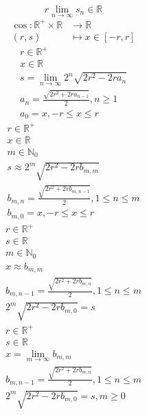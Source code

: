 \documentclass[a4paper,12pt]{report}
\begin{document}
\begin{equation}
r \lim_{n \to \infty} s_n \in \mathbb{R}
\end{equation}
\begin{equation}
\begin{aligned}
\cos \colon \mathbb{R}^{+} \times \mathbb{R} & \to \mathbb{R} \\
(r,s) & \mapsto x \in [-r,r]
\end{aligned}
\end{equation}
\begin{subequations}
\begin{gather}
r \in \mathbb{R}^+ \\
x \in \mathbb{R} \\
s = \lim \limits_{n \to \infty} 2^n \sqrt{2r^2 - 2ra_n} \\
a_n = \frac{\sqrt{2r^2 + 2ra_{n-1}}}{2}, n \geq 1 \\
a_0 = x, -r \leq x \leq r
\end{gather}
\end{subequations}
\begin{subequations}
\begin{gather}
r \in \mathbb{R}^+ \\
x \in \mathbb{R} \\
m \in \mathbb{N}_{0} \\
s \approx 2^m \sqrt{2r^2 - 2rb_{m,m}} \\
b_{m,n} = \frac{\sqrt{2r^2 + 2rb_{m,n-1}}}{2}, 1 \leq n \leq m \\
b_{m,0} = x, -r \leq x \leq r
\end{gather}
\end{subequations}
\begin{subequations}
\begin{gather}
r \in \mathbb{R}^+ \\
s \in \mathbb{R} \\
m \in \mathbb{N}_{0} \\
x \approx b_{m,m} \\
b_{m,n-1} = \frac{\sqrt{2r^2 + 2rb_{m,n}}}{2}, 1 \leq n \leq m \\
2^m \sqrt{2r^2 - 2rb_{m,0}} = s
\end{gather}
\end{subequations}
\begin{subequations}
\begin{gather}
r \in \mathbb{R}^+ \\
s \in \mathbb{R} \\
x = \lim \limits_{m \to \infty} b_{m,m} \\
b_{m,n-1} = \frac{\sqrt{2r^2 + 2rb_{m,n}}}{2}, 1 \leq n \leq m \\
2^m \sqrt{2r^2 - 2rb_{m,0}} = s, m \geq 0
\end{gather}
\end{subequations}
\end{document}
